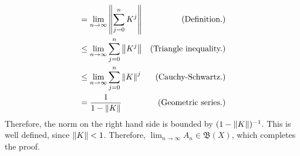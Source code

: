 \begin{solution}
\begin{align*}
        &=\lim_{n \rightarrow \infty}\norm{\sum_{j = 0}^n K^j} &\text{(Definition.)}\\
        &\leq \lim_{n \rightarrow \infty}\sum_{j = 0}^n \norm{K^j} &\text{(Triangle inequality.)}\\
        &\leq \lim_{n \rightarrow \infty}\sum_{j = 0}^n \norm{K}^j &\text{(Cauchy-Schwartz.)}\\
        &= \frac{1}{1 - \norm{K}} &\text{(Geometric series.)}
    \end{align*}
    \vspace{-12mm}\alignbreak
    Therefore, the norm on the right hand side is bounded by $(1 - \norm{K})^{-1}$. This is well defined, since $\norm{K} < 1$. Therefore, $\lim_{n \rightarrow \infty} A_n \in \mathfrak{B}(X)$, which completes the proof.
\end{solution}
